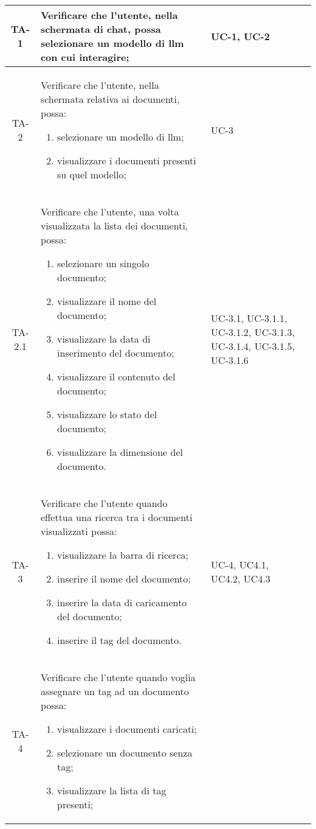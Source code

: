 \begin{xltabular}{\textwidth}{| c | X | X | c |}
    TA-1 & Verificare che l’utente, nella schermata di chat, possa selezionare un modello di llm con cui interagire; & UC-1, UC-2 &  \\
    \hline
    TA-2 & Verificare che l’utente, nella schermata relativa ai documenti, possa: \begin{enumerate}
        \item selezionare un modello di llm;
        \item visualizzare i documenti presenti su quel modello;
    \end{enumerate} & UC-3 &  \\
    \hline
    TA-2.1 & Verificare che l’utente, una volta visualizzata la lista dei documenti, possa: \begin{enumerate}
        \item selezionare un singolo documento;
        \item visualizzare il nome del documento;
        \item visualizzare la data di inserimento del documento;
        \item visualizzare il contenuto del documento;
        \item visualizzare lo stato del documento;
        \item visualizzare la dimensione del documento.
    \end{enumerate} & UC-3.1, UC-3.1.1, UC-3.1.2, UC-3.1.3, UC-3.1.4, UC-3.1.5, UC-3.1.6 &  \\
    \hline
    TA-3 & Verificare che l’utente quando effettua una ricerca tra i documenti visualizzati possa:
    \begin{enumerate}
        \item visualizzare la barra di ricerca;
        \item inserire il nome del documento;
        \item inserire la data di caricamento del documento;
        \item inserire il tag del documento.
    \end{enumerate}& UC-4, UC4.1, UC4.2, UC4.3 &  \\
    \hline
     TA-4 & Verificare che l’utente quando voglia assegnare un tag ad un documento possa:
    \begin{enumerate}
        \item visualizzare i documenti caricati;
        \item selezionare un documento senza tag;
        \item visualizzare la lista di tag presenti;

\end{enumerate}
\end{xltabular}
